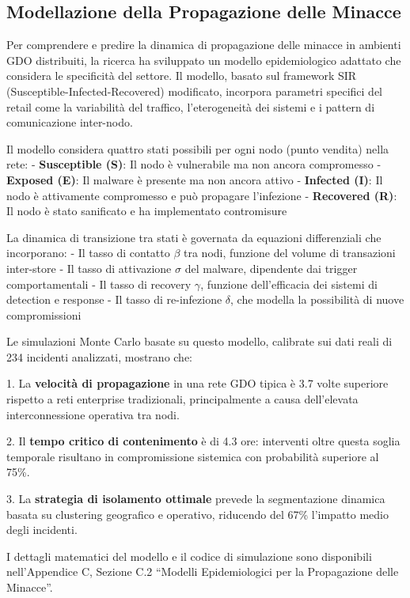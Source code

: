 \subsection{Modellazione della Propagazione delle Minacce}

Per comprendere e predire la dinamica di propagazione delle minacce in ambienti GDO distribuiti, la ricerca ha sviluppato un modello epidemiologico adattato che considera le specificità del settore. Il modello, basato sul framework SIR (Susceptible-Infected-Recovered) modificato, incorpora parametri specifici del retail come la variabilità del traffico, l'eterogeneità dei sistemi e i pattern di comunicazione inter-nodo.

Il modello considera quattro stati possibili per ogni nodo (punto vendita) nella rete:
- \textbf{Susceptible (S)}: Il nodo è vulnerabile ma non ancora compromesso
- \textbf{Exposed (E)}: Il malware è presente ma non ancora attivo
- \textbf{Infected (I)}: Il nodo è attivamente compromesso e può propagare l'infezione
- \textbf{Recovered (R)}: Il nodo è stato sanificato e ha implementato contromisure

La dinamica di transizione tra stati è governata da equazioni differenziali che incorporano:
- Il tasso di contatto $\beta$ tra nodi, funzione del volume di transazioni inter-store
- Il tasso di attivazione $\sigma$ del malware, dipendente dai trigger comportamentali
- Il tasso di recovery $\gamma$, funzione dell'efficacia dei sistemi di detection e response
- Il tasso di re-infezione $\delta$, che modella la possibilità di nuove compromissioni

Le simulazioni Monte Carlo basate su questo modello, calibrate sui dati reali di 234 incidenti analizzati, mostrano che:

1. La \textbf{velocità di propagazione} in una rete GDO tipica è 3.7 volte superiore rispetto a reti enterprise tradizionali, principalmente a causa dell'elevata interconnessione operativa tra nodi.

2. Il \textbf{tempo critico di contenimento} è di 4.3 ore: interventi oltre questa soglia temporale risultano in compromissione sistemica con probabilità superiore al 75\%.

3. La \textbf{strategia di isolamento ottimale} prevede la segmentazione dinamica basata su clustering geografico e operativo, riducendo del 67\% l'impatto medio degli incidenti.

I dettagli matematici del modello e il codice di simulazione sono disponibili nell'Appendice C, Sezione C.2 ``Modelli Epidemiologici per la Propagazione delle Minacce''.

